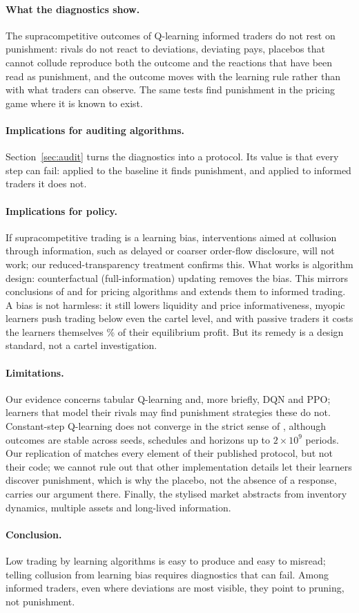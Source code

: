 \paragraph{What the diagnostics show.} The supracompetitive outcomes of
Q-learning informed traders do not rest on punishment: rivals do not react to
deviations, deviating pays, placebos that cannot collude reproduce both the
outcome and the reactions that have been read as punishment, and the outcome
moves with the learning rule rather than with what traders can observe. The
same tests find punishment in the pricing game where it is known to exist.

\paragraph{Implications for auditing algorithms.} Section~\ref{sec:audit}
turns the diagnostics into a protocol. Its value is that every step can fail:
applied to the \citet{calvano2020} baseline it finds punishment, and applied
to informed traders it does not.

\paragraph{Implications for policy.} If supracompetitive trading is a learning
bias, interventions aimed at collusion through information, such as delayed or
coarser order-flow disclosure, will not work; our reduced-transparency
treatment confirms this. What works is algorithm design: counterfactual
(full-information) updating removes the bias. This mirrors conclusions of
\citet{asker2022,asker2024} and \citet{abada2023} for pricing algorithms and
extends them to informed trading. A bias is not harmless: it still lowers
liquidity and price informativeness, myopic learners push trading below even
the cartel level, and with passive traders it costs the learners themselves
\PassiveProfitPct\% of their equilibrium profit. But its remedy is a
design standard, not a cartel investigation.

\paragraph{Limitations.} Our evidence concerns tabular Q-learning and, more
briefly, DQN and PPO; learners that model their rivals may find punishment
strategies these do not. Constant-step Q-learning does not converge in the
strict sense of \citet{calvano2020}, although outcomes are stable across seeds,
schedules and horizons up to $2\times10^9$ periods. Our replication of
\citet{dou2025} matches every element of their published protocol, but not
their code; we cannot rule out that other implementation details let their
learners discover punishment, which is why the placebo, not the absence of a
response, carries our argument there. Finally, the stylised market abstracts
from inventory dynamics, multiple assets and long-lived information.

\paragraph{Conclusion.} Low trading by learning algorithms is easy to produce
and easy to misread; telling collusion from learning bias requires
diagnostics that can fail. Among informed traders, even where deviations are
most visible, they point to pruning, not punishment.
